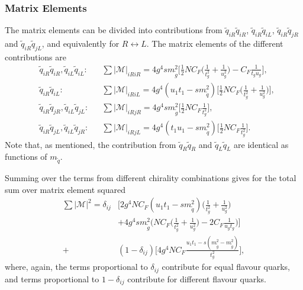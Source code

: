 \documentclass[twoside,english]{uiofysmaster}
\begin{document}
{\subsubsection{Matrix Elements}\label{Sec:: susy hadron : Matrix Elements}

The matrix elements can be divided into contributions from $\widetilde{q}_{iR} \widetilde{q}_{iR}$, $\widetilde{q}_{iR} \widetilde{q}_{iL}$, $\widetilde{q}_{iR} \widetilde{q}_{jR}$ and $\widetilde{q}_{iR} \widetilde{q}_{jL}$, and equivalently for $R \leftrightarrow L$. The matrix elements of the different contributions are
\begin{align}
&\widetilde{q}_{iR} \widetilde{q}_{iR}, \widetilde{q}_{iL} \widetilde{q}_{iL}: && \sum |\mathcal{M}|_{iRiR} = 4g^4 s m_{\widetilde{g}}^2 \Big[ \frac{1}{2} NC_F\Big( \frac{1}{t_g^2} + \frac{1}{u_g^2} \Big) - C_F \frac{1}{t_gu_g} \Big],\\
&\widetilde{q}_{iR} \widetilde{q}_{iL}: &&\sum |\mathcal{M}|_{iRiL}=  4 g^4 (u_1t_1 - sm_{\widetilde{q}}^2) \Big[ \frac{1}{2}NC_F \Big( \frac{1}{t_g^2} + \frac{1}{u_g^2} \Big) \Big],\\
& \widetilde{q}_{iR} \widetilde{q}_{jR}, \widetilde{q}_{iL} \widetilde{q}_{jL}: && \sum |\mathcal{M}|_{iRjR} = 4 g^4 sm_{\widetilde{g}}^2 \Big[\frac{1}{2} NC_F \frac{1}{t_g^2}  \Big],\\
& \widetilde{q}_{iR} \widetilde{q}_{jL}, \widetilde{q}_{iL} \widetilde{q}_{jR}: && \sum |\mathcal{M}|_{iRjL} = 4 g^4 (t_1u_1 - sm_{\widetilde{q}}^2) \Big[\frac{1}{2} NC_F \frac{1}{t_g^2}  \Big].
\end{align}
Note that, as mentioned, the contribution from $\widetilde{q}_R\widetilde{q}_R$ and $\widetilde{q}_L\widetilde{q}_L$ are identical as functions of $m_{\widetilde{q}}$.

Summing over the terms from different chirality combinations gives  for the total sum over matrix element squared 
\begin{align}
\sum |\mathcal{M}|^2 = \delta_{ij} & \Bigg[2 g^4NC_F(u_1t_1-sm_{\widetilde{q}}^2) \Big( \frac{1}{t_g^2} + \frac{1}{u_g^2} \Big) \nonumber \\& + 4 g^4 sm_{\widetilde{g}}^2 \Big( NC_F \Big(\frac{1}{t_g^2} + \frac{1}{u_g^2}\Big) -2C_F\frac{1}{u_gt_g} \Big) \Bigg] \nonumber \\
+& (1-\delta_{ij})\Bigg[4g^4NC_F  \frac{u_1t_1-s(m_{\widetilde{g}}^2-m_{\widetilde{g}}^2)}{t_g^2} \Bigg],
\end{align}
where, again, the terms proportional to $\delta_{ij}$ contribute for equal flavour quarks, and terms proportional to $1-\delta_{ij}$ contribute for different flavour quarks.


}
\end{document}
